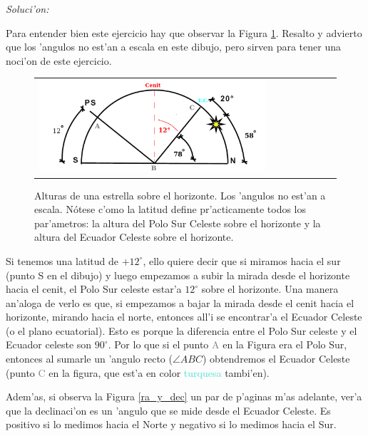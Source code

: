 \documentclass{article}
\begin{document}
\begin{enumerate}[a)]
\begin{enumerate} [i)]
\emph{Soluci'on:}

Para entender bien este ejercicio hay que observar la Figura \ref{cielo}. Resalto y advierto que los 'angulos no est'an a escala en este dibujo, pero sirven para tener una noci'on de este ejercicio.

\newpage

\begin{figure}[!ht]
\begin{center}
\begin{tabular}{ll}
  \includegraphics[width=0.8\textwidth]{cielo.png} 
\end{tabular}
\caption{{\small Alturas de una estrella sobre el horizonte. Los 'angulos no est'an a escala. Nótese c'omo la latitud define pr'acticamente todos los par'ametros: la altura del Polo Sur Celeste sobre el horizonte y la altura del Ecuador Celeste sobre el horizonte.}}\label{cielo}
\end{center} 
\end{figure}


Si tenemos una latitud de $+12^\circ$, ello quiere decir que si miramos hacia el sur (punto S en el dibujo) y luego empezamos a subir la mirada desde el horizonte hacia el cenit, el Polo Sur celeste estar'a $12^\circ$ sobre el horizonte. Una manera an'aloga de verlo es que, si empezamos a bajar la mirada desde el cenit hacia el horizonte, mirando hacia el norte, entonces all'i se encontrar'a el Ecuador Celeste (o el plano ecuatorial). Esto es porque la diferencia entre el Polo Sur celeste y el Ecuador celeste son $90^\circ$. Por lo que si el punto \textcolor{Gray}{A} en la Figura era el Polo Sur, entonces al sumarle un 'angulo recto ($\angle ABC$) obtendremos el Ecuador Celeste (punto \textcolor{Gray}{C} en la figura, que est'a en color \textcolor{Turquoise}{turquesa} tambi'en). 

Adem'as, si observa la Figura \ref{ra_y_dec} un par de p'aginas m'as adelante, ver'a que la declinaci'on es un 'angulo que se mide desde el Ecuador Celeste. Es positivo si lo medimos hacia el Norte y negativo si lo medimos hacia el Sur.


\end{enumerate}
\end{enumerate}
\end{document}
